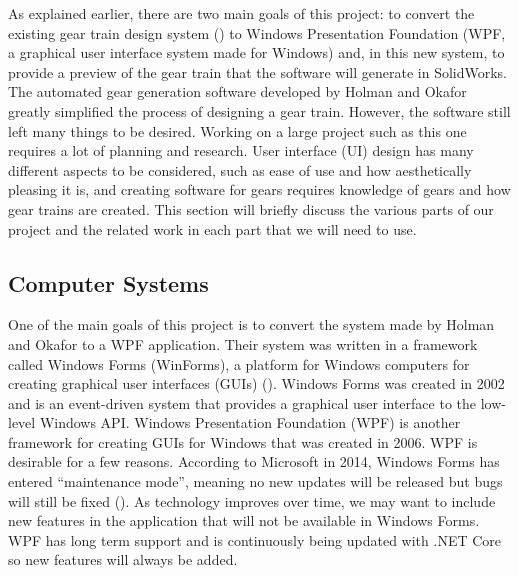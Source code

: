 \begin{doublespace}
As explained earlier, there are two main goals of this project: to convert the existing gear train design system (\cite{holman_automated_2018}) to Windows Presentation Foundation (WPF, a graphical user interface system made for Windows) and, in this new system, to provide a preview of the gear train that the software will generate in SolidWorks. The automated gear generation software developed by Holman and Okafor greatly simplified the process of designing a gear train. However, the software still left many things to be desired. Working on a large project such as this one requires a lot of planning and research. User interface (UI) design has many different aspects to be considered, such as ease of use and how aesthetically pleasing it is, and creating software for gears requires knowledge of gears and how gear trains are created. This section will briefly discuss the various parts of our project and the related work in each part that we will need to use.

\subsection{Computer Systems}
One of the main goals of this project is to convert the system made by Holman and Okafor to a WPF application. Their system was written in a framework called Windows Forms (WinForms), a platform for Windows computers for creating graphical user interfaces (GUIs) (\cite{microsoft_visual_2003}). Windows Forms was created in 2002 and is an event-driven system that provides a graphical user interface to the low-level Windows API. Windows Presentation Foundation (WPF) is another framework for creating GUIs for Windows that was created in 2006. WPF is desirable for a few reasons. According to Microsoft in 2014, Windows Forms has entered ``maintenance mode'', meaning no new updates will be released but bugs will still be fixed (\cite{allen_wpf_2014}). As technology improves over time, we may want to include new features in the application that will not be available in Windows Forms. WPF has long term support and is continuously being updated with .NET Core so new features will always be added.


\end{doublespace}

